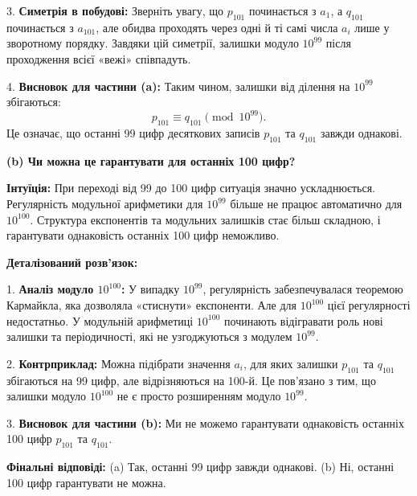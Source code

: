 \documentclass{article}
\begin{document}
3. \textbf{Симетрія в побудові:}  
   Зверніть увагу, що \( p_{101} \) починається з \( a_1 \), а \( q_{101} \) починається з \( a_{101} \), але обидва проходять через одні й ті самі числа \( a_i \) лише у зворотному порядку. Завдяки цій симетрії, залишки модуло \( 10^{99} \) після проходження всієї «вежі» співпадуть.

4. \textbf{Висновок для частини (a):}  
   Таким чином, залишки від ділення на \( 10^{99} \) збігаються:
   \[
   p_{101} \equiv q_{101} \pmod{10^{99}}.
   \]
   Це означає, що останні 99 цифр десяткових записів \( p_{101} \) та \( q_{101} \) завжди однакові.

\bigskip

\textbf{(b) Чи можна це гарантувати для останніх 100 цифр?}

\textbf{Інтуїція:}  
При переході від 99 до 100 цифр ситуація значно ускладнюється. Регулярність модульної арифметики для \( 10^{99} \) більше не працює автоматично для \( 10^{100} \). Структура експонентів та модульних залишків стає більш складною, і гарантувати однаковість останніх 100 цифр неможливо.

\textbf{Деталізований розв'язок:}

1. \textbf{Аналіз модуло \( 10^{100} \):}  
   У випадку \( 10^{99} \), регулярність забезпечувалася теоремою Кармайкла, яка дозволяла «стиснути» експоненти. Але для \( 10^{100} \) цієї регулярності недостатньо. У модульній арифметиці \( 10^{100} \) починають відігравати роль нові залишки та періодичності, які не узгоджуються з модулем \( 10^{99} \).

2. \textbf{Контрприклад:}  
   Можна підібрати значення \( a_i \), для яких залишки \( p_{101} \) та \( q_{101} \) збігаються на 99 цифр, але відрізняються на 100-й. Це пов'язано з тим, що залишки модуло \( 10^{100} \) не є просто розширенням модуло \( 10^{99} \).

3. \textbf{Висновок для частини (b):}  
   Ми не можемо гарантувати однаковість останніх 100 цифр \( p_{101} \) та \( q_{101} \).

\bigskip

\noindent\textbf{Фінальні відповіді:}  
(a) Так, останні 99 цифр завжди однакові.  
(b) Ні, останні 100 цифр гарантувати не можна.
\end{document}
